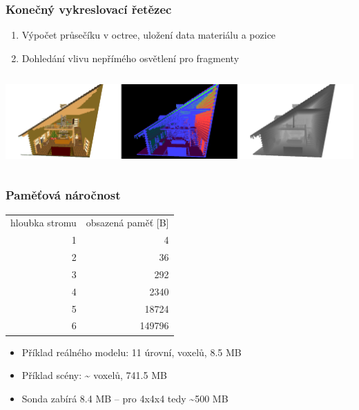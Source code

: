 \documentclass[10pt,xcolor=pdflatex,hyperref={unicode}]{beamer}
\begin{document}
\begin{frame}\frametitle{Konečný vykreslovací řetězec}
    \begin{enumerate}
        \item Výpočet průsečíku v octree, uložení data materiálu a pozice
        \item Dohledání vlivu nepřímého osvětlení pro fragmenty
    \end{enumerate}
    \begin{column}{\textwidth}
        \includegraphics[width=\textwidth]{img/gbuffer_render.png}
    \end{column}
\end{frame}

\begin{frame}\frametitle{Paměťová náročnost}
        \begin{table}[H]
        	\centering
        	\begin{tabular}{r|r}
        		\multicolumn{1}{c|}{hloubka stromu} & \multicolumn{1}{c}{obsazená paměť {[}B{]}} \\ \Xhline{3\arrayrulewidth}
        		1                                    & 4                                         \\ %
        		2                                    & 36                                        \\ %
        		3                                    & 292                                       \\ %
        		4                                    & 2340                                      \\ %
        		5                                    & 18724                                     \\ %
        		6                                    & 149796                                    \\ %
        	\end{tabular}
        \end{table}
        \begin{itemize}
            \item Příklad reálného modelu: 11 úrovní,  voxelů, 8.5 MB
            \item Příklad scény: \textasciitilde {} voxelů, 741.5 MB
            \item Sonda zabírá 8.4 MB -- pro 4x4x4 tedy \textasciitilde 500 MB
        \end{itemize}
\end{frame}
\end{document}
